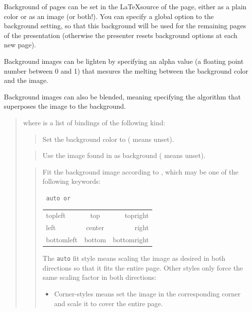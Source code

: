 \documentclass[12pt]{article}
\begin{document}
Background of pages can be set in the \LaTeX source of the page,
either as a plain color or as an image (or both!).
You can specify a global option to the background setting, so that this
background will be used for the remaining pages of the presentation
(otherwise the presenter resets background options at each new page).

Background images can be lighten by specifying an alpha value (a
floating point number between 0 and 1) that mesures the melting
between the background color and the image.

Background images can also be blended, meaning specifying the
algorithm that superposes the image to the background.

\medskip\noindent
\docdef \advibg \doctt {[global]}
\begin{quote}
where  is a list of bindings of the following kind:

\begin{quote}
Set the background color to 
( means unset).
\end{quote}

\begin{quote}
Use the image found in  as background ( means unset).
\end{quote}

\begin{quote}
Fit the background image according to , which may be 
one of the following keywords:
\begin{center}
\tt
auto \hfill {\rm or} \hfill
\begin{tabular}{l@{\qquad}c@{\qquad}r}
topleft&   top& topright\\
left&  center&  right \\
bottomleft& bottom & bottomright\\
\end{tabular}
\end{center}
The {\tt auto} fit style means scaling the image as desired in both directions
so that it fits the entire page. Other styles only force the same scaling
factor in both directions:
\begin {itemize}

\item Corner-styles means set the image in the corresponding corner
and scale it to cover the entire page.


\end{itemize}
\end{quote}
\end{quote}
\end{document}
